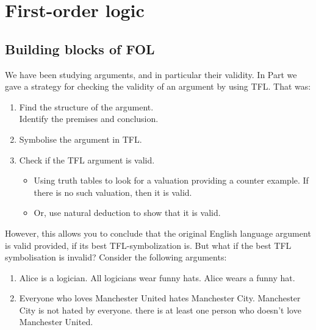 \part{First-order logic}
\label{ch.FOL}
\chapter{Building blocks of FOL}\label{s:FOLBuildingBlocks}
We have been studying arguments, and in particular their validity. In Part \label{ch.TFLsymb} we gave a strategy for checking the validity of an argument by using TFL. That was:
\begin{highlighted}\begin{enumerate}
\item Find the structure of the argument. \\Identify the premises and conclusion.
\item \label{itm:validity-symbolise}Symbolise the argument in TFL.
\item \label{itm:validity-TTs} Check if the TFL argument is valid.\begin{itemize}\item Using truth tables to look for a valuation providing a counter example. If there is no such valuation, then it is valid.
\item Or, use natural deduction to show that it is valid.
\end{itemize}
\end{enumerate}
\end{highlighted}

However, this allows you to conclude that the original English language argument is valid provided, if its best TFL-symbolization is. But what if the best TFL symbolisation is invalid? Consider the following arguments:
\begin{enumerate}
\item \begin{earg}
\label{willard1}
\prem Alice is a logician.
\prem All logicians wear funny hats.
\conc Alice wears a funny hat.
\end{earg}
\item \begin{earg}
\prem Everyone who loves Manchester United hates Manchester City.
\prem Manchester City is not hated by everyone.
\conc there is at least one person who doesn't love Manchester United.
\end{earg}
\end{enumerate}

